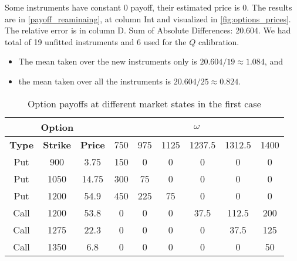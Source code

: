 \documentclass{article}
\begin{document}
Some instruments have constant 0 payoff, their estimated price is 0.
The results are in \autoref{payoff_reaminaing},
at column Int and visualized in \autoref{fig:options_prices}.
The relative error is in column D.
Sum of Absolute Differences: 20.604.
We had total of 19 unfitted instruments and 6 used for the $Q$ calibration.
\begin{itemize}
    \item The mean taken over the new instruments only is $20.604/19 \approx 1.084$, and
    \item the mean taken over all the instruments is $20.604/25 \approx 0.824$.
\end{itemize}


\begin{table}[h]
    \centering
    \caption{Option payoffs at different market states in the first case\label{neftci_first}}
    \begin{tabular}{|c|c|c|c|c|c|c|c|c|}
        \hline
        \multicolumn{3}{|c|}{\textbf{Option}} & \multicolumn{6}{c|}{$\omega$}                                                              \\ \hline
        \textbf{Type}                         & \textbf{Strike}               & \textbf{Price} & 750 & 975 & 1125 & 1237.5 & 1312.5 & 1400 \\ \hline
        Put                                   & 900                           & 3.75           & 150 & 0   & 0    & 0      & 0      & 0    \\ \hline
        Put                                   & 1050                          & 14.75          & 300 & 75  & 0    & 0      & 0      & 0    \\ \hline
        Put                                   & 1200                          & 54.9           & 450 & 225 & 75   & 0      & 0      & 0    \\ \hline
        Call                                  & 1200                          & 53.8           & 0   & 0   & 0    & 37.5   & 112.5  & 200  \\ \hline
        Call                                  & 1275                          & 22.3           & 0   & 0   & 0    & 0      & 37.5   & 125  \\ \hline
        Call                                  & 1350                          & 6.8            & 0   & 0   & 0    & 0      & 0      & 50   \\ \hline
    \end{tabular}
\end{table}
\end{document}
